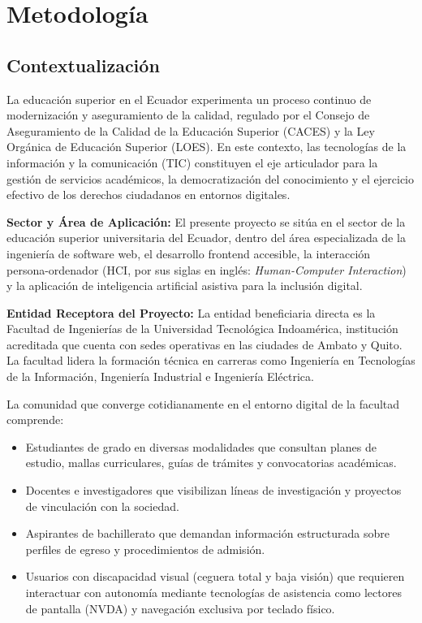 \chapter{Metodología}
\label{chap:metodologia}

\section{Contextualización}
La educación superior en el Ecuador experimenta un proceso continuo de modernización y aseguramiento de la calidad, regulado por el Consejo de Aseguramiento de la Calidad de la Educación Superior (CACES) y la Ley Orgánica de Educación Superior (LOES). En este contexto, las tecnologías de la información y la comunicación (TIC) constituyen el eje articulador para la gestión de servicios académicos, la democratización del conocimiento y el ejercicio efectivo de los derechos ciudadanos en entornos digitales.

\textbf{Sector y Área de Aplicación:} El presente proyecto se sitúa en el sector de la educación superior universitaria del Ecuador, dentro del área especializada de la ingeniería de software web, el desarrollo frontend accesible, la interacción persona-ordenador (HCI, por sus siglas en inglés: \textit{Human-Computer Interaction}) y la aplicación de inteligencia artificial asistiva para la inclusión digital.

\textbf{Entidad Receptora del Proyecto:} La entidad beneficiaria directa es la Facultad de Ingenierías de la Universidad Tecnológica Indoamérica, institución acreditada que cuenta con sedes operativas en las ciudades de Ambato y Quito. La facultad lidera la formación técnica en carreras como Ingeniería en Tecnologías de la Información, Ingeniería Industrial e Ingeniería Eléctrica.

La comunidad que converge cotidianamente en el entorno digital de la facultad comprende:
\begin{itemize}
  \item Estudiantes de grado en diversas modalidades que consultan planes de estudio, mallas curriculares, guías de trámites y convocatorias académicas.
  \item Docentes e investigadores que visibilizan líneas de investigación y proyectos de vinculación con la sociedad.
  \item Aspirantes de bachillerato que demandan información estructurada sobre perfiles de egreso y procedimientos de admisión.
  \item Usuarios con discapacidad visual (ceguera total y baja visión) que requieren interactuar con autonomía mediante tecnologías de asistencia como lectores de pantalla (NVDA) y navegación exclusiva por teclado físico.
\end{itemize}

